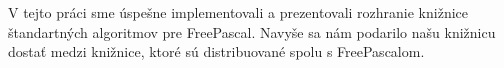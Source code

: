 V tejto práci sme úspešne implementovali a prezentovali rozhranie
knižnice štandartných algoritmov pre FreePascal.
Navyše sa nám podarilo našu knižnicu dostať medzi knižnice, ktoré
sú distribuované spolu s FreePascalom.
